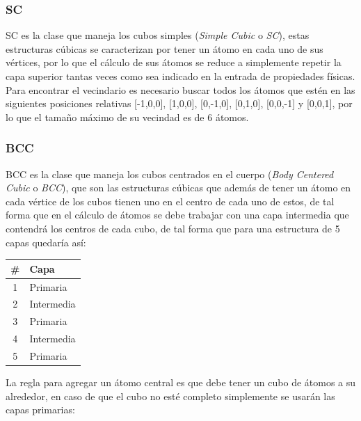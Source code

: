 \subsubsection{SC}
SC es la clase que maneja los cubos simples (\emph{Simple Cubic} o \emph{SC}), estas estructuras cúbicas se caracterizan por tener un átomo en cada uno de sus vértices, por lo que el cálculo de sus átomos se reduce a simplemente repetir la capa superior tantas veces como sea indicado en la entrada de propiedades físicas. Para encontrar el vecindario es necesario buscar todos los átomos que estén en las siguientes posiciones relativas [-1,0,0], [1,0,0], [0,-1,0], [0,1,0], [0,0,-1] y [0,0,1], por lo que el tamaño máximo de su vecindad es de 6 átomos.

\subsubsection{BCC}
BCC es la clase que maneja los cubos centrados en el cuerpo (\emph{Body Centered Cubic} o \emph{BCC}), que son las estructuras cúbicas que además de tener un átomo en cada vértice de los cubos tienen uno en el centro de cada uno de estos, de tal forma que en el cálculo de átomos se debe trabajar con una capa intermedia que contendrá los centros de cada cubo, de tal forma que para una estructura de 5 capas quedaría así:
\begin{center}
  \begin{tabular}{ c | l }
    \# & Capa \\
    \hline
    1 & Primaria \\
    2 & Intermedia \\
    3 & Primaria \\
    4 & Intermedia \\
    5 & Primaria \\
    \hline
  \end{tabular}
\end{center}

La regla para agregar un átomo central es que debe tener un cubo de átomos a su alrededor, en caso de que el cubo no esté completo simplemente se usarán las capas primarias:

